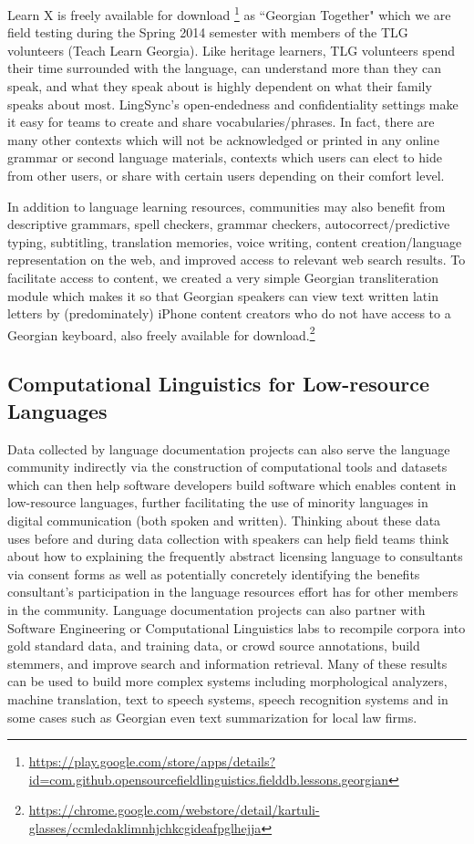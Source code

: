 \documentclass[11pt]{article}
\begin{document}
Learn X is freely available for download%
\footnote{\url{https://play.google.com/store/apps/details?id=com.github.opensourcefieldlinguistics.fielddb.lessons.georgian}} %
 as ``Georgian Together" which we are field testing during the Spring 2014 semester with members of the TLG volunteers (Teach Learn Georgia).
Like heritage learners, TLG volunteers spend their time surrounded with the
language, can understand more than they can speak, and what they speak about is
highly dependent on what their family speaks about most. LingSync's
open-endedness and confidentiality settings make it easy for teams to create
and share vocabularies/phrases.
In fact, there are many other contexts which will not be acknowledged or printed
in any online grammar or second language materials, contexts which users can
elect to hide from other users, or share with certain users depending on their
comfort level.

In addition to language learning resources, communities may also benefit from
descriptive grammars, spell checkers, grammar checkers, autocorrect/predictive
typing, subtitling, translation memories, voice writing, content
creation/language representation on the web, and improved access to relevant
web search results. To facilitate access to content, we created a very simple
Georgian transliteration module which makes it so that Georgian speakers can
view text written latin letters by (predominately) iPhone content creators who
do not have access to a Georgian keyboard, also freely available for
download.\footnote{\url{https://chrome.google.com/webstore/detail/kartuli-glasses/ccmledaklimnhjchkcgideafpglhejja}}


\subsection{Computational Linguistics for Low-resource Languages}

Data collected by language documentation projects can also serve the language community indirectly via the construction of computational tools and datasets which can then help software developers build software which enables content in low-resource languages, further facilitating the use of minority languages in digital communication (both spoken and written). Thinking about these data uses before and during data collection with speakers can help field teams think about how to explaining the frequently abstract licensing language to consultants via consent forms as well as potentially concretely identifying the benefits  consultant's participation in the language resources effort has for other members in the community. Language documentation projects can also partner with Software Engineering or Computational Linguistics labs to recompile corpora into gold standard data, and training data, or crowd source annotations, build stemmers, and improve search and information retrieval. Many of these results can be used to build more complex systems including morphological analyzers, machine translation, text to speech systems, speech recognition systems and in some cases such as Georgian even text summarization for local law firms.
\end{document}
